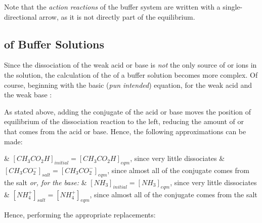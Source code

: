 				Note that the \textit{action reactions} of the buffer system are written with a single-directional arrow, as it is not
				directly part of the equilibrium.




		\pagebreak
		\subsection{\MpH{} of Buffer Solutions}

			Since the dissociation of the weak acid or base is \textit{not} the only source of  or  ions in the solution,
			the calculation of the \pH{} of a buffer solution becomes more complex. Of course, beginning with the basic (\textit{pun intended})
			equation, for the weak acid  and the weak base :


			As stated above, adding the conjugate of the acid or base moves the position of equilibrium of the dissociation reaction to the left,
			reducing the amount of  or  that comes from the acid or base. Hence, the following approximations can be made:

			\begin{bulletlist}
				& $[CH_{3}CO_{2}H]_{initial} = [CH_{3}CO_{2}H]_{eqm}$, since very little  dissociates
				& $[CH_{3}CO_{2}^{-}]_{salt} = [CH_{3}CO_{2}^{-}]_{eqm}$, since almost all of the conjugate comes from the salt
					\linebreak\linebreak\textit{or, for the base:}
				& $[NH_{3}]_{initial} = [NH_{3}]_{eqm}$, since very little  dissociates
				& $[NH_{4}^{+}]_{salt} = [NH_{4}^{+}]_{eqm}$, since almost all of the conjugate comes from the salt
			\end{bulletlist}

			Hence, performing the appropriate replacements:


